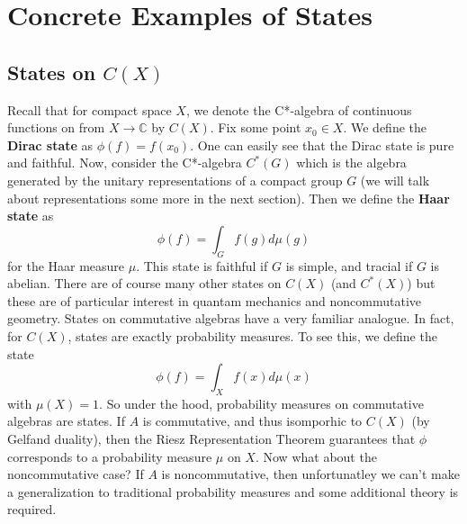 \section{Concrete Examples of States}
\subsection{States on \( C(X) \)}
Recall that for compact space $X$, we denote the C*-algebra of continuous functions
on from $X \to \mathbb{C}$ by $C(X)$. Fix some point $x_0 \in X$. We define the \textbf{Dirac state} as
$\phi(f) = f(x_0)$. One can easily see that the Dirac state is pure and faithful.
Now, consider the C*-algebra $C^*(G)$ which is the algebra generated by the unitary representations
of a compact group $G$ (we will talk about representations some more in the next section).
Then we define the \textbf{Haar state} as
\begin{equation}
    \phi(f) = \int_G f(g)d\mu (g)
\end{equation}
for the Haar measure $\mu$. This state is faithful if $G$ is simple, and tracial if
$G$ is abelian. There are of course many other states on $C(X)$ (and $C^*(X)$) but
these are of particular interest in quantam mechanics and noncommutative geometry.
States on commutative algebras have a very familiar analogue. In fact, for $C(X)$,
states are exactly probability measures. To see this, we define the state
\begin{equation}
    \phi(f) = \int_X f(x) d \mu(x)   
\end{equation}
with $\mu(X) = 1$. So under the hood, probability measures on commutative algebras
are states. If $A$ is commutative, and thus isomporhic to
$C(X)$ (by Gelfand duality), then the Riesz Representation Theorem guarantees that
$\phi$ corresponds to a probability measure $\mu$ on $X$. Now what about the noncommutative
case? If $A$ is noncommutative, then unfortunatley we can't make a generalization
to traditional probability measures and some additional theory is required.


